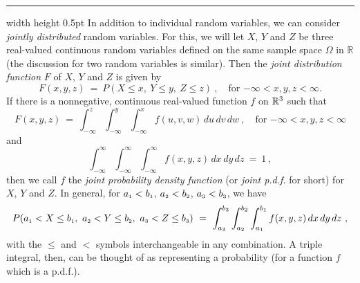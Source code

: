 \hrule width \textwidth height 0.5pt
\newpage
In addition to individual random variables, we can consider \emph{jointly distributed} random variables. For this, we
will let $X$, $Y$ and $Z$ be three real-valued continuous random variables defined on the same sample space
$\Omega$ in $\mathbb{R}$ (the discussion for two random variables is similar). Then the \emph{joint distribution
function} $F$ of $X$, $Y$ and $Z$ is given by
\begin{equation}
 F(x,y,z) ~=~ P(X \le x,~Y \le y,~Z \le z)~, \quad \text{for $-\infty < x,y,z < \infty$.}
\end{equation}
If there is a nonnegative, continuous real-valued function $f$ on $\mathbb{R}^{3}$ such that
\begin{equation}\label{eqn:pdf3}
 F(x,y,z) ~=~ \int_{-\infty}^z \int_{-\infty}^y \int_{-\infty}^x f(u,v,w)\,du\,dv\,dw~,
 \quad \text{for $-\infty < x,y,z < \infty$}
\end{equation}
and
\begin{equation}\label{eqn:pdfint3}
\int_{-\infty}^{\infty} \int_{-\infty}^{\infty} \int_{-\infty}^{\infty} f(x,y,z)\,dx\,dy\,dz ~=~ 1 ~,
\end{equation}
then we call $f$ the \emph{joint probability density function} (or \emph{joint p.d.f.} for short) for $X$, $Y$ and $Z$.
In general, for $a_{\scriptscriptstyle 1} < b_{\scriptscriptstyle 1}$, $a_{\scriptscriptstyle 2} < b_{\scriptscriptstyle 2}$, $a_{\scriptscriptstyle 3} < b_{\scriptscriptstyle 3}$, we have
\begin{equation}\label{eqn:pdfprob3}
 P(a_{\scriptscriptstyle 1} < X \le b_{\scriptscriptstyle 1},~a_{\scriptscriptstyle 2} < Y \le b_{\scriptscriptstyle 2},~a_{\scriptscriptstyle 3} < Z \le b_{\scriptscriptstyle 3}) ~=~
 \int_{a_{\scriptscriptstyle 3}}^{b_{\scriptscriptstyle 3}}\int_{a_{\scriptscriptstyle 2}}^{b_{\scriptscriptstyle 2}}\int_{a_{\scriptscriptstyle 1}}^{b_{\scriptscriptstyle 1}} f(x,y,z)\,dx\,dy\,dz~,
\end{equation}
with the $\le$ and $<$ symbols interchangeable in any combination. A triple integral, then, can be thought of as
representing a probability (for a function $f$ which is a p.d.f.).

